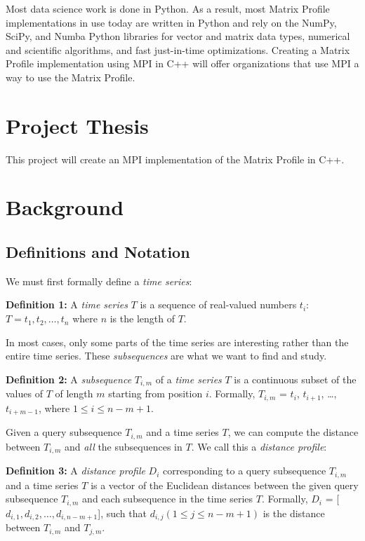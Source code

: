 \documentclass[conference]{IEEEtran}
\begin{document}
Most data science work is done in Python.  As a result, most Matrix Profile implementations in use today are written in Python\cite{Stumpy} and rely on the NumPy, SciPy, and Numba Python libraries for vector and matrix data types, numerical and scientific algorithms, and fast just-in-time optimizations.  Creating a Matrix Profile implementation using MPI in C++ will offer organizations that use MPI a way to use the Matrix Profile. 

\section{Project Thesis}
This project will create an MPI implementation of the Matrix Profile in C++.

\section{Background}
\subsection{Definitions and Notation}

We must first formally define a \emph{time series}:

\textbf{Definition 1:} A \emph{time series} $T$ is a sequence of real-valued numbers $t_i$: $T = t_1, t_2, \ldots{}, t_n$ where $n$ is the length of $T$.

In most cases, only some parts of the time series are interesting rather than the entire time series.  These \emph{subsequences} are what we want to find and study.

\textbf{Definition 2:} A \emph{subsequence} $T_{i,m}$ of a \emph{time series} $T$ is a continuous subset of the values of $T$ of length $m$ starting from position $i$.  Formally, $T_{i,m}$ = $t_i$, $t_{i+1}$, \ldots{}, $t_{i+m-1}$, where $1 \leq i \leq n-m+1$.

Given a query subsequence $T_{i,m}$ and a time series $T$, we can compute the distance between $T_{i,m}$ and \emph{all} the subsequences in $T$.  We call this a \emph{distance profile}:

\textbf{Definition 3:} A \emph{distance profile} $D_i$ corresponding to a query subsequence $T_{i,m}$ and a time series $T$ is a vector of the Euclidean distances between the given query subsequence $T_{i,m}$ and each subsequence in the time series $T$.  Formally, $D_i$ = [$d_{i,1}, d_{i,2}, \ldots{}, d_{i,n-m+1}$], such that $d_{i,j}(1 \leq j \leq n-m+1)$ is the distance between $T_{i,m}$ and $T_{j,m}$.
\end{document}
